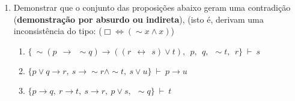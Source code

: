 \documentclass[12pt, a4paper,final]{article}
\begin{document}
\begin{enumerate}
\item Demonstrar que o conjunto das proposi\c c\~oes abaixo geram uma contradi\c c\~ao ({\bf demons\-tra\c c\~ao por absurdo ou indireta}),  (isto \'e, derivam uma inconsist\^encia do tipo: ($\Box \Leftrightarrow (\sim x \wedge x)$)

\begin{enumerate}










\item $\{\ \sim (p\:\: \rightarrow \:\: \sim q) \rightarrow ((r \:\: \leftrightarrow \:\: s) \vee t),\:\:  p,\:\:  q,\:\:  \sim t    ,\:\:  r \} ~\vdash~    s $



\item $\{ p \vee q \rightarrow r,~ s \rightarrow \sim r \wedge \sim t,~ s \vee u   \} ~\vdash~ p \rightarrow u$

\item $\{ p \rightarrow q,~ r \rightarrow t,~ s \rightarrow r,~ p \vee s ,\:\: \sim q  \} ~\vdash~  t $


\end{enumerate}

\end{enumerate}
\end{document}

